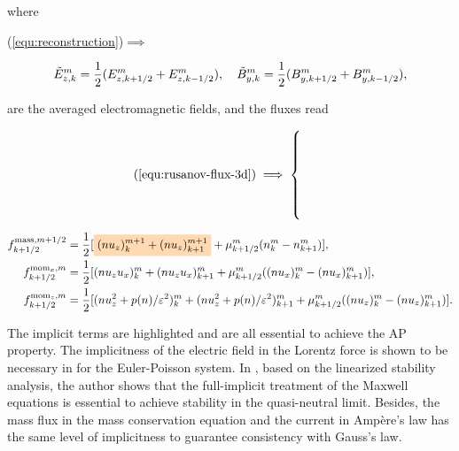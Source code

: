 \documentclass{article}
\newcommand{\mycolorbox}[2]{\colorbox{#1}{$\displaystyle#2$}}
\begin{document}
\noindent where

\hspace{0.3cm}\begin{minipage}{0.1\textwidth}
    \vspace{0.3cm}
    (\ref{equ:reconstruction})$\implies$
\end{minipage}
\hspace{1cm}
\begin{minipage}{0.6\textwidth}
\begin{equation*}
     \Tilde{E}^m_{z,k} = \frac{1}{2}(E^m_{z,k+1/2} + E^m_{z,k-1/2}), \ \ \ \Tilde{B}^m_{y,k} = \frac{1}{2}(B^m_{y,k+1/2} + B^m_{y,k-1/2}),
\end{equation*}    
\end{minipage} 

\noindent are the averaged electromagnetic fields, and the fluxes read

\hspace{0.2cm}\begin{minipage}{0.1\textwidth}
    \begin{align*}
        (\ref{equ:rusanov-flux-3d}) &\implies \begin{cases}
         \\
         \\
         \\
         \\
         \\
        \end{cases}
    \end{align*}
\end{minipage}
\begin{minipage}{0.6\textwidth}
    \begin{align*}
    f^{\text{mass},m+1/2}_{k+1/2} & = \frac{1}{2}[\mycolorbox{orange!30}{(nu_z)^{m+1}_k + (nu_z)^{m+1}_{k+1}} + \mu^m_{k+1/2}(n^m_k - n^m_{k+1})], \\
    f^{\text{mom}_x,m}_{k+1/2} & = \frac{1}{2}[(nu_zu_x)^{m}_k + (nu_zu_x)^{m}_{k+1} + \mu^m_{k+1/2}((nu_x)^m_k - (nu_x)^m_{k+1})], \\
    f^{\text{mom}_z,m}_{k+1/2} & = \frac{1}{2}[(nu_z^2 + p(n)/\varepsilon^2)^{m}_k + (nu_z^2 + p(n)/\varepsilon^2)^{m}_{k+1} + \mu^m_{k+1/2}((nu_z)^m_k - (nu_z)^m_{k+1})].
\end{align*}
\end{minipage}

The implicit terms are highlighted and are all essential to achieve the AP property. The
implicitness of the electric field in the Lorentz force is shown to be necessary in
\cite{fabre_1992} for the Euler-Poisson system. In \cite{degond_2012}, based on the
linearized stability analysis, the author shows that the full-implicit treatment of the
Maxwell equations is essential to achieve stability in the quasi-neutral limit. Besides,
the mass flux in the mass conservation equation and the current in Amp\`{e}re's law has
the same level of implicitness to guarantee consistency with Gauss's law.
\end{document}
